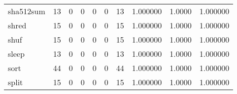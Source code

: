\begin{longtable}{lrrrrrrrrr}
sha512sum &                                       13 &                                                  0 &                                                  0 &                                                  0 &                                                  0 &                                                 13 &                                           1.000000 &                                 1.0000 &                             1.000000 \\
shred     &                                       15 &                                                  0 &                                                  0 &                                                  0 &                                                  0 &                                                 15 &                                           1.000000 &                                 1.0000 &                             1.000000 \\
shuf      &                                       15 &                                                  0 &                                                  0 &                                                  0 &                                                  0 &                                                 15 &                                           1.000000 &                                 1.0000 &                             1.000000 \\
sleep     &                                       13 &                                                  0 &                                                  0 &                                                  0 &                                                  0 &                                                 13 &                                           1.000000 &                                 1.0000 &                             1.000000 \\
sort      &                                       44 &                                                  0 &                                                  0 &                                                  0 &                                                  0 &                                                 44 &                                           1.000000 &                                 1.0000 &                             1.000000 \\
split     &                                       15 &                                                  0 &                                                  0 &                                                  0 &                                                  0 &                                                 15 &                                           1.000000 &                                 1.0000 &                             1.000000 \\

\end{longtable}
